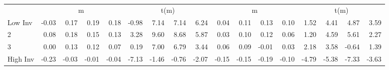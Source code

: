\begin{table}[!ht]
\begin{tabular}{lrrrrrrrrrrrrrrrr}
  
    
      & \multicolumn{4}{c}{m} & \multicolumn{4}{c}{t(m)}
    
      & \multicolumn{4}{c}{m} & \multicolumn{4}{c}{t(m)}
    
    \\
      \cmidrule(r){2-5} \cmidrule(r){6-9} \cmidrule(r){10-13} \cmidrule(r){14-17}

    Low Inv   & -0.03  & 0.17  & 0.19  & 0.18  & -0.98  & 7.14  & 7.14  & 6.24  & 0.04  & 0.11  & 0.13  & 0.10  & 1.52  & 4.41  & 4.87  & 3.59  \\
           2  & 0.08  & 0.18  & 0.15  & 0.13  & 3.28  & 9.60  & 8.68  & 5.87  & 0.03  & 0.10  & 0.12  & 0.06  & 1.20  & 4.59  & 5.61  & 2.27  \\
           3  & 0.00  & 0.13  & 0.12  & 0.07  & 0.19  & 7.00  & 6.79  & 3.44  & 0.06  & 0.09  & -0.01  & 0.03  & 2.18  & 3.58  & -0.64  & 1.39  \\
    High Inv  & -0.23  & -0.03  & -0.01  & -0.04  & -7.13  & -1.46  & -0.76  & -2.07  & -0.15  & -0.15  & -0.19  & -0.10  & -4.79  & -5.38  & -7.33  & -3.63  \\

  

  \bottomrule
\end{tabular}
\label{tbl:32_Size_OP_Inv_C97b}
\end{table}